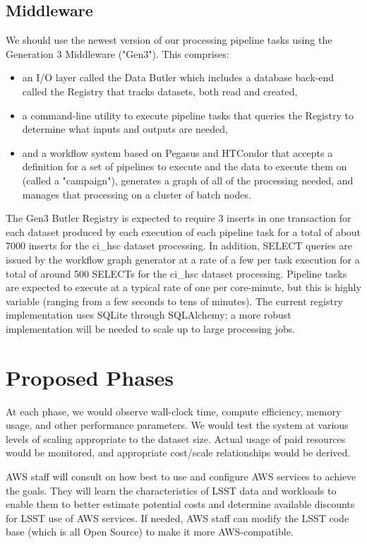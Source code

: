 \subsection{Middleware} \label{sec:drp-middleware}
We should use the newest version of our processing pipeline tasks using the Generation 3 Middleware ("Gen3"). This comprises:
\begin{itemize}
\item an I/O layer called the Data Butler which includes a database back-end called the Registry that tracks datasets, both read and created,
\item a command-line utility to execute pipeline tasks that queries the Registry to determine what inputs and outputs are needed,
\item and a workflow system based on Pegasus and HTCondor that accepts a definition for a set of pipelines to execute and the data to execute them on (called a "campaign"), generates a graph of all of the processing needed, and manages that processing on a cluster of batch nodes.
\end{itemize}

The Gen3 Butler Registry is expected to require 3 inserts in one transaction for each dataset produced by each execution of each pipeline task for a total of about 7000 inserts for the ci\_hsc dataset processing.
In addition, SELECT queries are issued by the workflow graph generator at a rate of a few per task execution for a total of around 500 SELECTs for the ci\_hsc dataset processing.
Pipeline tasks are expected to execute at a typical rate of one per core-minute, but this is highly variable (ranging from a few seconds to tens of minutes).
The current registry implementation uses SQLite through SQLAlchemy; a more robust implementation will be needed to scale up to large processing jobs.

\section{Proposed Phases} \label{sec:phases}
At each phase, we would observe wall-clock time, compute efficiency, memory usage, and other performance parameters. We would test the system at various levels of scaling appropriate to the dataset size. Actual usage of paid resources would be monitored, and appropriate cost/scale relationships would be derived.

AWS staff will consult on how best to use and configure AWS services to achieve the goals. They will learn the characteristics of LSST data and workloads to enable them to better estimate potential costs and determine available discounts for LSST use of AWS services. If needed, AWS staff can modify the LSST code base (which is all Open Source) to make it more AWS-compatible.

